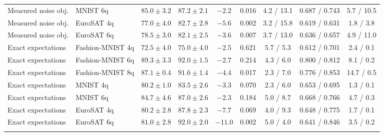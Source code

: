 \begin{table}[t]
\begin{tabular}{@{}llccccccc@{}}
Measured noise obj. & MNIST 6q & $85.0\pm3.2$ & $87.2\pm2.1$ & $-2.2$ & 0.016 & 4.2 / 13.1 & 0.687 / 0.743 & 5.7 / 10.5 \\
Measured noise obj. & EuroSAT 4q & $77.0\pm4.0$ & $82.7\pm2.8$ & $-5.6$ & 0.002 & 3.2 / 15.8 & 0.619 / 0.631 & 1.8 / 3.8 \\
Measured noise obj. & EuroSAT 6q & $78.5\pm3.0$ & $82.1\pm2.5$ & $-3.6$ & 0.007 & 3.7 / 13.0 & 0.636 / 0.657 & 4.9 / 11.0 \\
\midrule
Exact expectations & Fashion-MNIST 4q & $72.5\pm4.0$ & $75.0\pm4.0$ & $-2.5$ & 0.621 & 5.7 / 5.3 & 0.612 / 0.701 & 2.4 / 0.1 \\
Exact expectations & Fashion-MNIST 6q & $89.3\pm3.3$ & $92.0\pm1.5$ & $-2.7$ & 0.214 & 4.3 / 6.0 & 0.800 / 0.812 & 8.1 / 0.2 \\
Exact expectations & Fashion-MNIST 8q & $87.1\pm0.4$ & $91.6\pm1.4$ & $-4.4$ & 0.017 & 2.3 / 7.0 & 0.776 / 0.853 & 14.7 / 0.5 \\
Exact expectations & MNIST 4q & $80.2\pm1.0$ & $83.5\pm2.6$ & $-3.3$ & 0.070 & 2.3 / 6.0 & 0.653 / 0.695 & 1.3 / 0.1 \\
Exact expectations & MNIST 6q & $84.7\pm4.6$ & $87.0\pm2.6$ & $-2.3$ & 0.184 & 5.0 / 8.7 & 0.668 / 0.766 & 4.7 / 0.3 \\
Exact expectations & EuroSAT 4q & $80.2\pm2.8$ & $87.8\pm2.3$ & $-7.7$ & 0.069 & 4.0 / 9.3 & 0.648 / 0.775 & 1.7 / 0.1 \\
Exact expectations & EuroSAT 6q & $81.0\pm2.8$ & $92.0\pm2.0$ & $-11.0$ & 0.002 & 5.0 / 4.0 & 0.641 / 0.846 & 3.5 / 0.2 \\
\botrule
\end{tabular}
\end{table}

